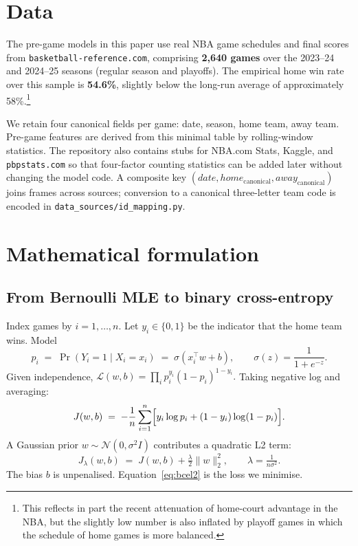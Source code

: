 \documentclass[11pt]{article}
\newcommand{\sigmoid}{\sigma}
\begin{document}
\section{Data}\label{sec:data}

The pre-game models in this paper use real NBA game schedules and
final scores from \texttt{basketball-reference.com}, comprising
\textbf{2{,}640 games} over the 2023--24 and 2024--25 seasons (regular
season and playoffs). The empirical home win rate over this sample is
\textbf{54.6\%}, slightly below the long-run average of approximately
58\%.\footnote{This reflects in part the recent attenuation of
home-court advantage in the NBA, but the slightly low number is also
inflated by playoff games in which the schedule of home games is more
balanced.}

We retain four canonical fields per game: date, season, home team,
away team. Pre-game features are derived from this minimal table by
rolling-window statistics. The repository also contains stubs for
NBA.com Stats, Kaggle, and \texttt{pbpstats.com} so that four-factor
counting statistics can be added later without changing the model
code. A composite key $(date, home_{\text{canonical}},
away_{\text{canonical}})$ joins frames across sources; conversion to a
canonical three-letter team code is encoded in
\texttt{data\_sources/id\_mapping.py}.

\section{Mathematical formulation}\label{sec:math}

\subsection{From Bernoulli MLE to binary cross-entropy}

Index games by $i = 1, \dots, n$. Let $y_i \in \{0, 1\}$ be the indicator
that the home team wins. Model
\[
  p_i \;=\; \Pr(Y_i = 1 \mid X_i = x_i) \;=\; \sigmoid(x_i^\top w + b),
  \qquad \sigmoid(z) = \frac{1}{1 + e^{-z}}.
\]
Given independence,
\(
  \mathcal{L}(w,b) = \prod_i p_i^{y_i}(1-p_i)^{1-y_i}.
\)
Taking negative log and averaging:
\begin{equation}\label{eq:bce}
  J(w,b) \;=\; -\frac{1}{n}\sum_{i=1}^n \Bigl[y_i \log p_i + (1-y_i)\log(1-p_i)\Bigr].
\end{equation}
A Gaussian prior $w \sim \mathcal{N}(0, \sigma^2 I)$ contributes a
quadratic L2 term:
\begin{equation}\label{eq:bcel2}
  J_\lambda(w,b) \;=\; J(w,b) + \tfrac{\lambda}{2} \lVert w \rVert_2^2,
  \qquad \lambda = \tfrac{1}{n\sigma^2}.
\end{equation}
The bias $b$ is unpenalised. Equation~\eqref{eq:bcel2} is the loss we
minimise.
\end{document}
